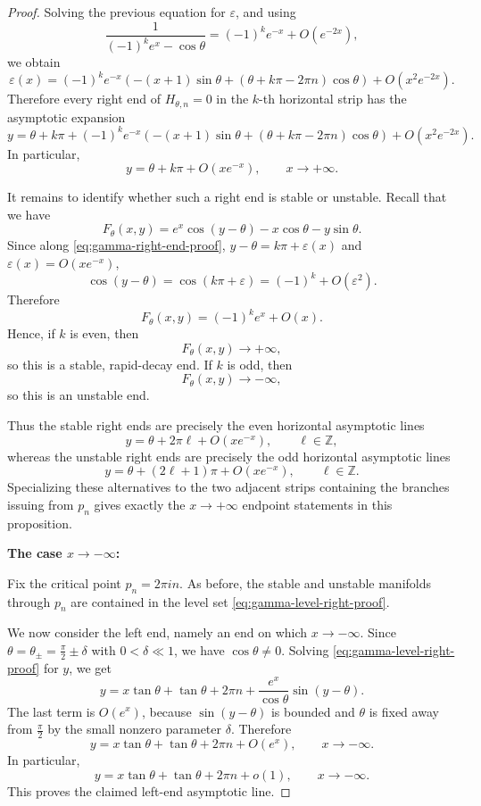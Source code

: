\documentclass[11pt]{amsart}
\theoremstyle{plain}
\begin{document}
\begin{proof}
Solving the previous equation for \(\varepsilon\), and using
\[
\frac{1}{(-1)^k e^x-\cos\theta}
=
(-1)^k e^{-x}+O(e^{-2x}),
\]
we obtain
\begin{equation*}\label{eq:gamma-right-epsilon-proof}
\varepsilon(x)
=
(-1)^k e^{-x}
\left(
-(x+1)\sin\theta
+
(\theta+k\pi-2\pi n)\cos\theta
\right)
+
O(x^2e^{-2x}).
\end{equation*}
Therefore every right end of \(H_{\theta,n}=0\) in the \(k\)-th horizontal
strip has the asymptotic expansion
\begin{equation}\label{eq:gamma-right-end-proof}
y
=
\theta+k\pi
+
(-1)^k e^{-x}
\left(
-(x+1)\sin\theta
+
(\theta+k\pi-2\pi n)\cos\theta
\right)
+
O(x^2e^{-2x}).
\end{equation}
In particular,
\[
y=\theta+k\pi+O(xe^{-x}),
\qquad x\to+\infty.
\]

It remains to identify whether such a right end is stable or unstable.  Recall that we have
\[
F_\theta(x,y)
=
e^x\cos(y-\theta)-x\cos\theta-y\sin\theta.
\]
Since along \eqref{eq:gamma-right-end-proof}, \(y-\theta=k\pi+\varepsilon(x)\) and \(\varepsilon(x)=O(xe^{-x})\),
\[
\cos(y-\theta)
=
\cos(k\pi+\varepsilon)
=
(-1)^k+O(\varepsilon^2).
\]
Therefore
\[
F_\theta(x,y)
=
(-1)^k e^x+O(x).
\]
Hence, if \(k\) is even, then
\[
F_\theta(x,y)\to+\infty,
\]
so this is a stable, rapid-decay end.  If \(k\) is odd, then
\[
F_\theta(x,y)\to-\infty,
\]
so this is an unstable end.

Thus the stable right ends are precisely the even horizontal asymptotic lines
\[
y=\theta+2\pi \ell+O(xe^{-x}),
\qquad \ell\in\mathbb Z,
\]
whereas the unstable right ends are precisely the odd horizontal asymptotic
lines
\[
y=\theta+(2\ell+1)\pi+O(xe^{-x}),
\qquad \ell\in\mathbb Z.
\]
Specializing these alternatives to the two adjacent strips containing the
branches issuing from \(p_n\) gives exactly the \(x\to+\infty\) endpoint
statements in this proposition.

\medskip
\noindent\textbf{The case $x\rightarrow-\infty$:}


Fix the critical point \(p_n=2\pi i n\).  As before, the stable and unstable
manifolds through \(p_n\) are contained in the level set \eqref{eq:gamma-level-right-proof}.

We now consider the left end, namely an end on which \(x\to-\infty\).  Since
\(\theta=\theta_\pm=\frac{\pi}{2}\pm\delta\) with \(0<\delta\ll1\), we have
\(\cos\theta\neq0\).  Solving \eqref{eq:gamma-level-right-proof} for \(y\), we get
\begin{equation*}\label{eq:gamma-left-solved-proof}
y
=
x\tan\theta
+
\tan\theta
+
2\pi n
+
\frac{e^x}{\cos\theta}\sin(y-\theta).
\end{equation*}
The last term is \(O(e^x)\), because \(\sin(y-\theta)\) is bounded and
\(\theta\) is fixed away from \(\frac{\pi}{2}\) by the small nonzero parameter
\(\delta\).  Therefore
\begin{equation}\label{eq:gamma-left-asymptotic-proof}
y
=
x\tan\theta
+
\tan\theta
+
2\pi n
+
O(e^x),
\qquad x\to-\infty.
\end{equation}
In particular,
\[
y
=
x\tan\theta
+
\tan\theta
+
2\pi n
+
o(1),
\qquad x\to-\infty.
\]
This proves the claimed left-end asymptotic line.


\end{proof}
\end{document}
